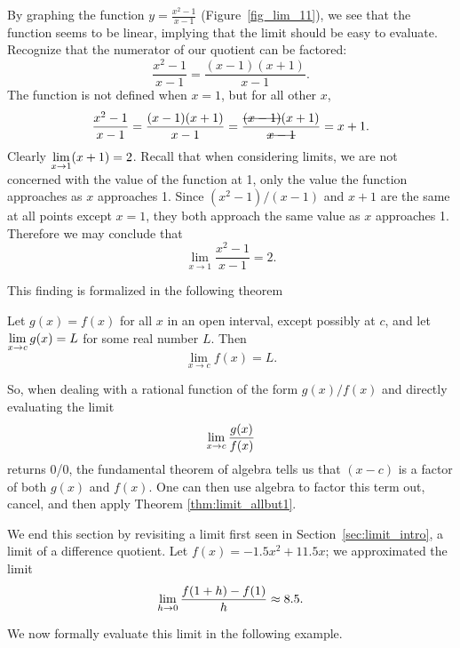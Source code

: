 By graphing the function $y=\frac{x^2-1}{x-1}$ (Figure~\ref{fig_lim_11}), we see that the function seems to be linear, implying that the limit should be easy to evaluate. Recognize that the numerator of our quotient can be factored:
$$\frac{x^2-1}{x-1} = \frac{(x-1)(x+1)}{x-1}.$$
The function is not defined when $x=1$, but for all other $x$, $$\frac{x^2-1}{x-1} = \frac{(x-1)(x+1)}{x-1} = \frac{\hbox{\sout{$(x-1)$}}(x+1)}{\hbox{\sout{$x-1$}}}= x+1.$$
Clearly $\displaystyle \lim_{x\to 1}(x+1) = 2$. Recall that when considering limits, we are not concerned with the value of the function at 1, only the value the function approaches as $x$ approaches 1. Since $(x^2-1)/(x-1)$ and $x+1$ are the same at all points except $x=1$, they both approach the same value as $x$ approaches 1. Therefore we may conclude that 
$$\lim_{x\to 1}\frac{x^2-1}{x-1}=2.$$


This finding is formalized in the following theorem

\begin{theorem}\label{thm:limit_allbut1}
Let $g(x) = f(x)$ for all $x$ in an open interval, except possibly at $c$, and let $\displaystyle \lim_{x\to c} g(x) = L$ for some real number $L$. Then $$\lim_{x\to c}f(x) = L.$$
\end{theorem}

So, when dealing with a rational function of the form $g(x)/f(x)$ and directly evaluating the limit 
$$\displaystyle \lim_{x\to c} \frac{g(x)}{f(x)}$$ 
returns 0/0, the fundamental theorem of algebra tells us that $(x-c)$ is a factor of both $g(x)$ and $f(x)$. One can then use algebra to factor this term out, cancel, and then apply Theorem \ref{thm:limit_allbut1}. 


\ifcourse 
We end this section by revisiting a limit first seen in Section~\ref{sec:limit_intro}, a limit of a difference quotient. Let $f(x) = -1.5x^2+11.5x$; we approximated the limit 
$$\displaystyle \lim_{h\to 0}\frac{f(1+h)-f(1)}{h}\approx 8.5.$$ 

We now formally evaluate this limit in the following example.

